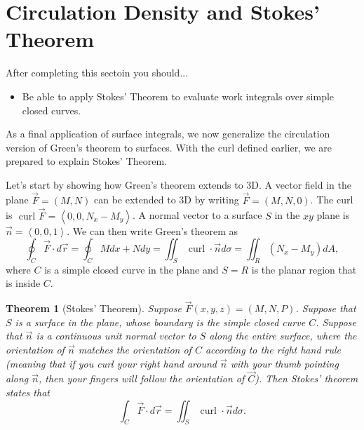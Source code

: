 \documentclass[10pt,]{book}
\theoremstyle{plain}
\newtheorem{theorem}{Theorem}[section]
\theoremstyle{definition}
\theoremstyle{definition}
\theoremstyle{definition}
\theoremstyle{definition}
\theoremstyle{definition}
\numberwithin{equation}{section}
\newcommand{\lt}{<}
\begin{document}
\section[{Circulation Density and Stokes' Theorem}]{Circulation Density and Stokes' Theorem}\label{section-44}
After completing this sectoin you should... \leavevmode%
\begin{itemize}[label=\textbullet]
\item{}Be able to apply Stokes' Theorem to evaluate work integrals over simple closed curves.%
\end{itemize}
%
\par
As a final application of surface integrals, we now generalize the circulation version of Green's theorem to surfaces. With the curl defined earlier, we are prepared to explain Stokes' Theorem.%
\par
Let's start by showing how Green's theorem extends to 3D. A vector field in the plane \(\vec F = \left(M,N\right)\) can be extended to 3D by writing \(\vec F = \left(M,N,0\right)\). The curl is \(\text{ curl } \vec F = \left\lt 0,0,N_x-M_y\right>\). A normal vector to a surface \(S\) in the \(xy\) plane is \(\vec n = \left\lt 0,0,1\right>\). We can then write Green's theorem as%
\begin{equation*}
\oint_C\vec F\cdot d\vec r = \oint_C Mdx+Ndy = \iint_S \text{ curl } \cdot \vec n d\sigma = \iint_R \left(N_x-M_y\right) dA,
\end{equation*}
where \(C\) is a simple closed curve in the plane and \(S=R\) is the planar region that is inside \(C\).%
\begin{theorem}[{Stokes' Theorem}]\label{theorem-14}
Suppose \(\vec F(x,y,z) = (M,N,P)\). Suppose that \(S\) is a surface in the plane, whose boundary is the simple closed curve \(C\). Suppose that \(\vec n\) is a continuous unit normal vector to \(S\) along the entire surface, where the orientation of \(\vec n\) matches the orientation of \(C\) according to the right hand rule (meaning that if you curl your right hand around \(\vec n\) with your thumb pointing along \(\vec n\), then your fingers will follow the orientation of \(\vec C\)). Then Stokes' theorem states that%
\begin{equation*}
\int_C\vec F\cdot d\vec r = \iint_S \text{ curl } \cdot \vec n d\sigma .
\end{equation*}
%
\end{theorem}
\end{document}
